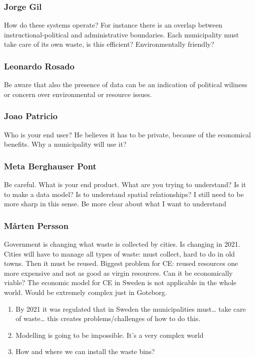 \subsubsection{Jorge Gil}
How do these systems operate? For instance there is an overlap between instructional-political and administrative boundaries.  Each municipality must take care of its own waste, is this efficient? Environmentally friendly? 


\subsubsection{Leonardo Rosado}
Be aware that also the presence of data can be an indication of political wiliness or concern over environmental or resource issues. 

\subsubsection{Joao Patricio}
Who is your end user? He believes it has to be private, because of the economical benefits. Why a municipality will use it?

\subsubsection{Meta Berghauser Pont}
Be careful. What is your end product. What are you trying to understand? Is it to make a data model? Is to understand spatial relationships?
I still need to be more sharp in this sense. Be more clear about what I want to understand


\subsubsection{Mårten Persson}
Government is changing what waste is collected by cities. Is changing in 2021. Cities will have to manage all types of waste: must collect, hard to do in old towns. Then it must be reused.
Biggest problem for CE: reused resources one more expensive and not as good as virgin resources. Can it be economically viable?
The economic model for CE in Sweden is not applicable in the whole world. Would be extremely complex just in Goteborg. 
\begin{enumerate}
    \item By 2021 it was regulated that in Sweden the municipalities must… take care of waste… this creates problems/challenges of how to do this.
    \item Modelling is going to be impossible. It’s a very complex world
    \item How and where we can install the waste bins?
\end{enumerate}




